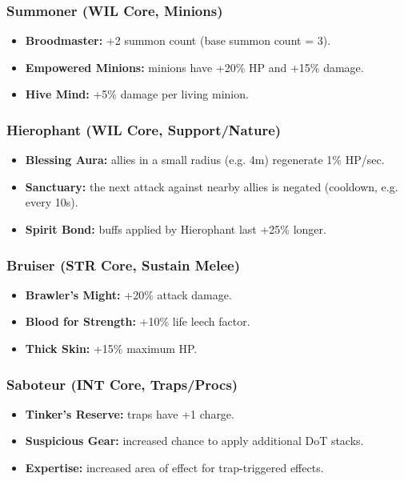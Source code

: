 \subsubsection*{Summoner (WIL Core, Minions)}

\begin{itemize}
	\item \textbf{Broodmaster:} +2 summon count (base summon count = 3).
	\item \textbf{Empowered Minions:} minions have +20\% HP and +15\% damage.
	\item \textbf{Hive Mind:} +5\% damage per living minion.
\end{itemize}

\subsubsection*{Hierophant (WIL Core, Support/Nature)}

\begin{itemize}
	\item \textbf{Blessing Aura:} allies in a small radius (e.g. 4m) regenerate 1\% HP/sec.
	\item \textbf{Sanctuary:} the next attack against nearby allies is negated (cooldown, e.g. every 10s).
	\item \textbf{Spirit Bond:} buffs applied by Hierophant last +25\% longer.
\end{itemize}

\subsubsection*{Bruiser (STR Core, Sustain Melee)}

\begin{itemize}
	\item \textbf{Brawler’s Might:} +20\% attack damage.
	\item \textbf{Blood for Strength:} +10\% life leech factor.
	\item \textbf{Thick Skin:} +15\% maximum HP.
\end{itemize}

\subsubsection*{Saboteur (INT Core, Traps/Procs)}

\begin{itemize}
	\item \textbf{Tinker’s Reserve:} traps have +1 charge.
	\item \textbf{Suspicious Gear:} increased chance to apply additional DoT stacks.
	\item \textbf{Expertise:} increased area of effect for trap-triggered effects.
\end{itemize}

